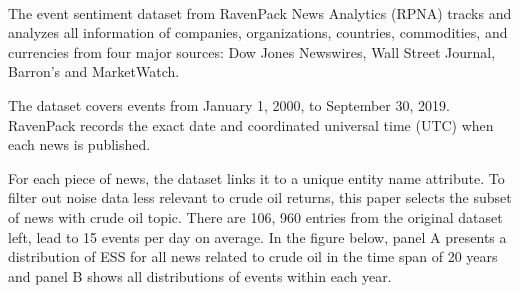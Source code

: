 \documentclass[12pt]{article}
\begin{document}
	\paragraph{} The event sentiment dataset from RavenPack News Analytics (RPNA) tracks and analyzes all information of companies, organizations, countries, commodities, and currencies from four major sources: Dow Jones Newswires, Wall Street Journal, Barron’s and MarketWatch.
	\par The dataset covers events from January 1, 2000, to September 30, 2019. RavenPack records the exact date and coordinated universal time (UTC) when each news is published.
	\par For each piece of news, the dataset links it to a unique entity name attribute. To filter out noise data less relevant to crude oil returns, this paper selects the subset of news with crude oil topic. There are 106, 960 entries from the original dataset left, lead to 15 events per day on average. In the figure below, panel A presents a distribution of ESS for all news related to crude oil in the time span of 20 years and panel B shows all distributions of events within each year.
\end{document}
